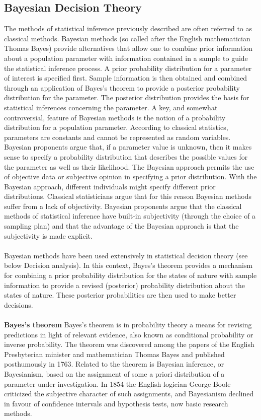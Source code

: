 \documentclass[MachineLearning]{subfiles}
\begin{document}
\subsection{Bayesian Decision Theory}
The methods of statistical inference previously described are often referred to as classical methods. Bayesian methods (so called after the English mathematician Thomas Bayes) provide alternatives that allow one to combine prior information about a population parameter with information contained in a sample to guide the statistical inference process. A prior probability distribution for a parameter of interest is specified first. Sample information is then obtained and combined through an application of Bayes’s theorem to provide a posterior probability distribution for the parameter. The posterior distribution provides the basis for statistical inferences concerning the parameter. A key, and somewhat controversial, feature of Bayesian methods is the notion of a probability distribution for a population parameter. According to classical statistics, parameters are constants and cannot be represented as random variables. Bayesian proponents argue that, if a parameter value is unknown, then it makes sense to specify a probability distribution that describes the possible values for the parameter as well as their likelihood. The Bayesian approach permits the use of objective data or subjective opinion in specifying a prior distribution. With the Bayesian approach, different individuals might specify different prior distributions. Classical statisticians argue that for this reason Bayesian methods suffer from a lack of objectivity. Bayesian proponents argue that the classical methods of statistical inference have built-in subjectivity (through the choice of a sampling plan) and that the advantage of the Bayesian approach is that the subjectivity is made explicit.\\\\
Bayesian methods have been used extensively in statistical decision theory (see below Decision analysis). In this context, Bayes’s theorem provides a mechanism for combining a prior probability distribution for the states of nature with sample information to provide a revised (posterior) probability distribution about the states of nature. These posterior probabilities are then used to make better decisions.\\\\
\textbf{Bayes’s theorem}
Bayes’s theorem is in probability theory a means for revising predictions in light of relevant evidence, also known as conditional probability or inverse probability. The theorem was discovered among the papers of the English Presbyterian minister and mathematician Thomas Bayes and published posthumously in 1763. Related to the theorem is Bayesian inference, or Bayesianism, based on the assignment of some a priori distribution of a parameter under investigation. In 1854 the English logician George Boole criticized the subjective character of such assignments, and Bayesianism declined in favour of confidence intervals and hypothesis tests, now basic research methods.
\end{document}
